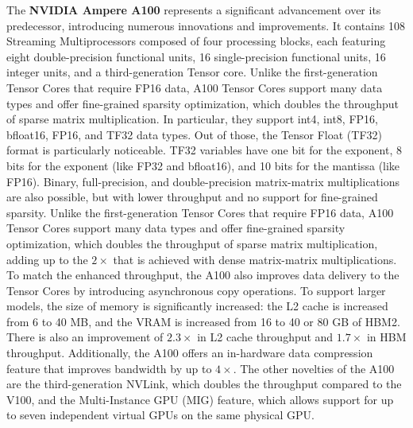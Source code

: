 The \textbf{NVIDIA Ampere A100} \cite{Choquette2021} represents a significant advancement over its predecessor, introducing numerous innovations and improvements.
It contains 108 Streaming Multiprocessors composed of four processing blocks, each featuring eight double-precision functional units, 16 single-precision functional units, 16 integer units, and a third-generation Tensor core.
Unlike the first-generation Tensor Cores that require FP16 data, A100 Tensor Cores support many data types and offer fine-grained sparsity optimization, which doubles the throughput of sparse matrix multiplication. In particular, they support int4, int8, FP16, bfloat16, FP16, and TF32 data types. Out of those, the Tensor Float (TF32) format is particularly noticeable. TF32 variables have one bit for the exponent, 8 bits for the exponent (like FP32 and bfloat16), and 10 bits for the mantissa (like FP16). Binary, full-precision, and double-precision matrix-matrix multiplications are also possible, but with lower throughput and no support for fine-grained sparsity.
Unlike the first-generation Tensor Cores that require FP16 data, A100 Tensor Cores support many data types and offer fine-grained sparsity optimization, which doubles the throughput of sparse matrix multiplication, adding up to the $2\times$ that is achieved with dense matrix-matrix multiplications. To match the enhanced throughput, the A100 also improves data delivery to the Tensor Cores by introducing asynchronous copy operations.
To support larger models, the size of memory is significantly increased: the L2 cache is increased from 6 to 40 MB, and the VRAM is increased from 16 to 40 or 80 GB of HBM2. There is also an improvement of $2.3\times$ in L2 cache throughput and $1.7\times$ in HBM throughput. Additionally, the A100 offers an in-hardware data compression feature that improves bandwidth by up to $4\times$.
The other novelties of the A100 are the third-generation NVLink, which doubles the throughput compared to the V100, and the Multi-Instance GPU (MIG) feature, which allows support for up to seven independent virtual GPUs on the same physical GPU.


